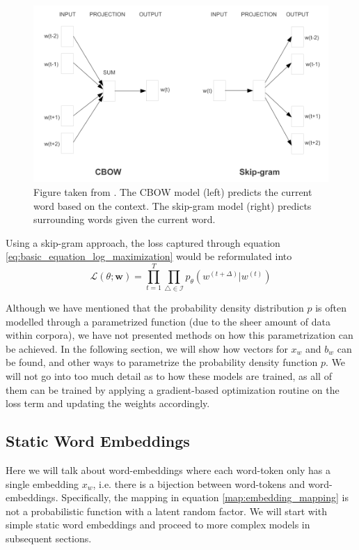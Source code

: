 \documentclass[a4paper,12pt,oneside,openright]{report}
\begin{document}
\begin{figure}[h]
	\center
  \includegraphics[width=0.6\linewidth]{./assets/background/cbow_and_skipgram.png}
  \caption{Figure taken from \cite{mikolov13}. The CBOW model (left) predicts the current word based on the context. The skip-gram model (right) predicts surrounding words given the current word.}
  \label{fig:cbow_skipgram}
\end{figure}

Using a skip-gram approach, the loss captured through equation \eqref{eq:basic_equation_log_maximization} would be reformulated into 
\begin{equation}
\mathcal{L}(\theta ; \mathbf{w})=\prod_{t=1}^{T} \prod_{\triangle \in \mathcal{I}} p_{\theta}\left(w^{(t +\Delta)} | w^{(t)}\right)
\end{equation}{\label{eq:basic_equation_log_maximization_skipgram}}

Although we have mentioned that the probability density distribution $p$ is often modelled through a parametrized function (due to the sheer amount of data within corpora), we have not presented methods on how this parametrization can be achieved.
In the following section, we will show how vectors for $x_w$ and $b_w$ can be found, and other ways to parametrize the probability density function $p$.
We will not go into too much detail as to how these models are trained, as all of them can be trained by applying a gradient-based optimization routine on the loss term and updating the weights accordingly.

\subsection{Static Word Embeddings}

Here we will talk about word-embeddings where each word-token only has a single embedding $x_w$, i.e. there is a bijection between word-tokens and word-embeddings. 
Specifically, the mapping in equation \eqref{map:embedding_mapping} is not a probabilistic function with a latent random factor.
We will start with simple static word embeddings and proceed to more complex models in subsequent sections.
\end{document}
